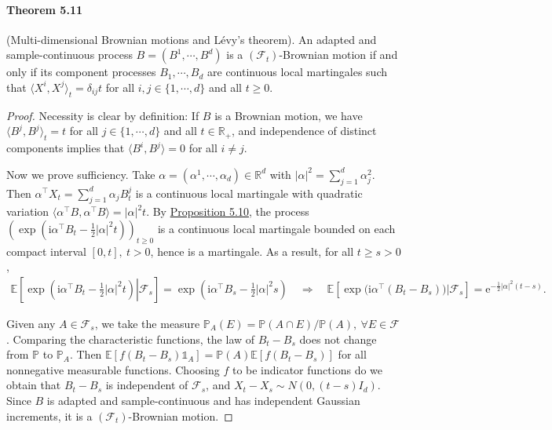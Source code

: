 \documentclass{article}
\numberwithin{equation}{section}
\newcommand{\e}{\mathrm{e}}
\newcommand{\E}{\mathbb{E}}
\renewcommand{\P}{\mathbb{P}}
\renewcommand{\i}{\mathrm{i}}
\theoremstyle{plain}
\theoremstyle{definition}
\begin{document}
\paragraph{Theorem 5.11\label{thm:5.11}} (Multi-dimensional Brownian motions and Lévy’s theorem). An adapted and sample-continuous process $B=(B^1,\cdots,B^d)$ is a $(\mathscr{F}_t)$-Brownian motion if and only if its component processes $B_1,\cdots,B_d$ are continuous local martingales such that $\langle X^i,X^j\rangle_t=\delta_{ij}t$ for all $i,j\in\{1,\cdots,d\}$ and all $t\geq 0$.
\begin{proof}
Necessity is clear by definition: If $B$ is a Brownian motion, we have $\langle B^j,B^j\rangle_t=t$ for all $j\in\{1,\cdots,d\}$ and all $t\in\mathbb{R}_+$, and independence of distinct components implies that $\langle B^i,B^j\rangle=0$ for all $i\neq j$.

Now we prove sufficiency. Take $\alpha=(\alpha^1,\cdots,\alpha_d)\in\mathbb{R}^d$ with $\vert\alpha\vert^2=\sum_{j=1}^d\alpha_j^2$. Then $\alpha^\top X_t = \sum_{j=1}^d\alpha_j B^j_t$ is a continuous local martingale with quadratic variation $\langle \alpha^\top B,\alpha^\top B\rangle = \vert\alpha\vert^2 t$. By \hyperref[prop:5.10]{Proposition 5.10}, the process $\left(\exp(\i\alpha^\top B_t-\frac{1}{2}\vert\alpha\vert^2t)\right)_{t\geq 0}$ is a continuous local martingale bounded on each compact interval $[0,t],\ t>0$, hence is a martingale. As a result, for all $t\geq s>0$,
\begin{align*}
	\E\left[\left.\exp\left(\i\alpha^\top B_t-\frac{1}{2}\vert\alpha\vert^2t\right)\right|\mathscr{F}_s\right] = \exp\left(\i\alpha^\top B_s-\frac{1}{2}\vert\alpha\vert^2s\right) \quad\Rightarrow\quad \E\left[\exp\bigl(\i\alpha^\top(B_t-B_s)\bigr)|\mathscr{F}_s\right]=\e^{-\frac{1}{2}\vert\alpha\vert^2(t-s)}.
\end{align*}

Given any $A\in\mathscr{F}_s$, we take the measure $\P_A(E)=\P(A\cap E)/\P(A),\ \forall E\in\mathscr{F}$. Comparing the characteristic functions, the law of $B_t-B_s$ does not change from $\P$ to $\P_A$. Then $\E\left[f(B_t-B_s)\mathds{1}_A\right]=\P(A)\E\left[f(B_t-B_s)\right]$ for all nonnegative measurable functions. Choosing $f$ to be indicator functions do we obtain that $B_t-B_s$ is independent of $\mathscr{F}_s$, and $X_t-X_s\sim N(0,(t-s)I_d)$. Since $B$ is adapted and sample-continuous and has independent Gaussian increments, it is a $(\mathscr{F}_t)$-Brownian motion.
\end{proof}
\end{document}

